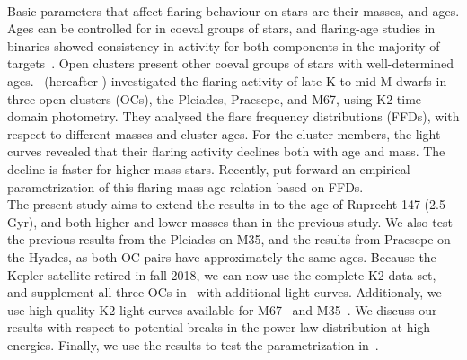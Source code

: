 \documentclass{aa}
\begin{document}
\\
Basic parameters that affect flaring behaviour on stars are their masses, and ages. Ages can be controlled for in coeval groups of stars, and flaring-age studies in binaries showed consistency in activity for both components in the majority of targets~\citep{lurie_kepler_2015, clarke_flare_2018}. Open clusters present other coeval groups of stars with well-determined ages. \citet{ilin_flares_2019}~(hereafter ) investigated the flaring activity of late-K to mid-M dwarfs in three open clusters (OCs), the Pleiades, Praesepe, and M67, using K2 time domain photometry. They analysed the flare frequency distributions (FFDs), with respect to different masses and cluster ages. For the cluster members, the light curves revealed that their flaring activity declines both with age and mass. The decline is faster for higher mass stars. Recently, \citet{davenport_flaresevolve_2019} put forward an empirical parametrization of this flaring-mass-age relation based on FFDs.
\\
The present study aims to extend the results in  to the age of Ruprecht 147 (2.5 Gyr), and both higher and lower masses than in the previous study. We also test the previous results from the Pleiades on M35, and the results from Praesepe on the Hyades, as both OC pairs have approximately the same ages. Because the Kepler satellite retired in fall 2018, we can now use the complete K2 data set, and supplement all three OCs in~  with additional light curves. Additionaly, we use high quality K2 light curves available for M67~\citep{nardiello_m67psf_2016} and M35~\citep{soares_furtado_m35_2017}. We discuss our results with respect to potential breaks in the power law distribution at high energies. Finally, we use the results to test the parametrization in~\citet{davenport_flaresevolve_2019}.

\end{document}
